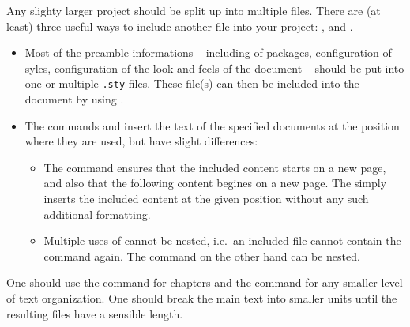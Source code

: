 Any slighty larger project should be split up into multiple files.
There are (at least) three useful ways to include another file into your project: ,  and .
\begin{itemize}[leftmargin=*]
  \item
    Most of the preamble informations -- including of packages, configuration of syles, configuration of the look and feels of the document -- should be put into one or multiple \texttt{.sty} files.
    These file(s) can then be included into the document by using .
  \item
    The commands  and  insert the text of the specified documents at the position where they are used, but have slight differences:
    \begin{itemize}[label = \textopenbullet, leftmargin=*]
      \item
        The  command ensures that the included content starts on a new page, and also that the following content begines on a new page.
        The  simply inserts the included content at the given position without any such additional formatting.
      \item
        Multiple uses of  cannot be nested, i.e.\ an included file cannot contain the  command again.
        The  command on the other hand can be nested.
        
    \end{itemize}
\end{itemize}

One should use the  command for chapters and the  command for any smaller level of text organization.
One should break the main text into smaller units until the resulting files have a sensible length.

